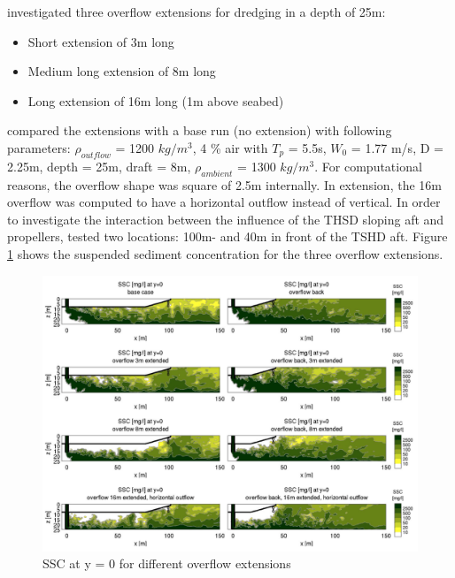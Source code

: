 \noindent \cite{Dewit} investigated three overflow extensions for dredging in a depth of 25m:
\begin{itemize}
    \item Short extension of 3m long
    \item Medium long extension of 8m long
    \item Long extension of 16m long (1m above seabed) 
\end{itemize}

\noindent \cite{Dewit} compared the extensions with a base run (no extension) with following parameters: $\rho_{outflow}$ =  1200 $kg/m^3$, 4 \% air with $T_p$ =  5.5s, $W_0$ =  1.77 m/s, D =  2.25m, depth =  25m, draft =  8m, $\rho_{ambient}$ =  1300 $kg/m^3$. For computational reasons, the overflow shape was square of 2.5m internally. In extension, the 16m overflow was computed to have a horizontal outflow instead of vertical. In order to investigate the interaction between the influence of the THSD sloping aft and propellers, \cite{Dewit} tested two locations: 100m- and 40m in front of the TSHD aft. Figure \ref{fig:Overflow_extension_dewit} shows the suspended sediment concentration for the three overflow extensions.


\begin{figure}[ht!]
    \centering
    \includegraphics[width = 1\textwidth]{Images/Overflow_extension_dewit.png}
    \caption{SSC at y = 0 for different overflow extensions}
    \label{fig:Overflow_extension_dewit}
\end{figure}

